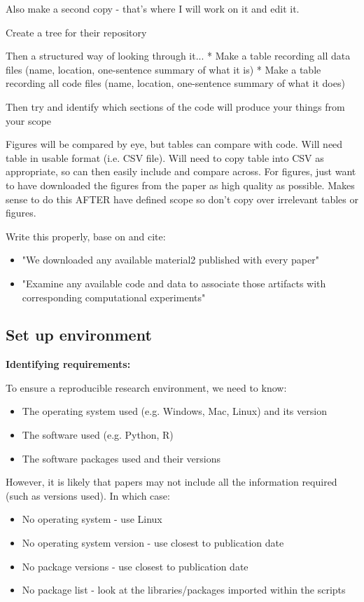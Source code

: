 Also make a second copy - that's where I will work on it and edit it.

Create a tree for their repository

Then a structured way of looking through it...
* Make a table recording all data files (name, location, one-sentence summary of what it is)
* Make a table recording all code files (name, location, one-sentence summary of what it does)

Then try and identify which sections of the code will produce your things from your scope

Figures will be compared by eye, but tables can compare with code. Will need table in usable format (i.e. CSV file). Will need to copy table into CSV as appropriate, so can then easily include and compare across. For figures, just want to have downloaded the figures from the paper as high quality as possible. Makes sense to do this AFTER have defined scope so don't copy over irrelevant tables or figures.

Write this properly, base on and cite:
\begin{itemize}
    \item "We downloaded any available material2 published with every paper"\cite{laurinavichyute_share_2022}
    \item "Examine any available code and data to associate those artifacts with corresponding computational experiments"\cite{krafczyk_learning_2021}
\end{itemize}

\subsection{Set up environment}


\textbf{Identifying requirements:}

To ensure a reproducible research environment, we need to know:
\begin{itemize}
    \item The operating system used (e.g. Windows, Mac, Linux) and its version 
    \item The software used (e.g. Python, R)
    \item The software packages used and their versions\autocite{the_turing_way_community_turing_2022}
\end{itemize}

However, it is likely that papers may not include all the information required (such as versions used). In which case:
\begin{itemize}
    \item No operating system - use Linux
    \item No operating system version - use closest to publication date
    \item No package versions - use closest to publication date
    \item No package list - look at the libraries/packages imported within the scripts
\end{itemize}

